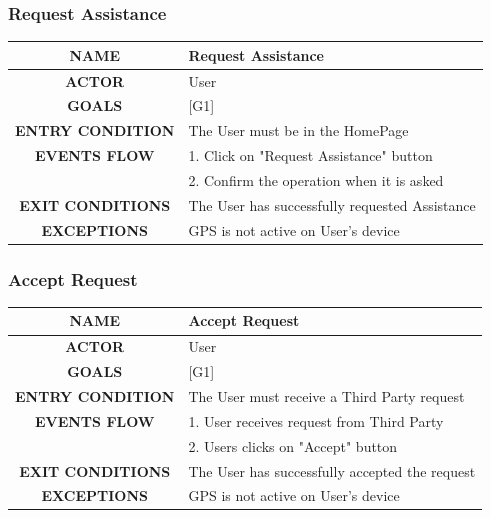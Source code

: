 \documentclass[12pt,a4paper]{article}
\begin{document}
	\subsubsection{Request Assistance}
	\begin{center}
		\begin{tabular}{| c | l |}
			\hline
			\textbf{NAME} & Request Assistance \\
			\hline
			\textbf{ACTOR} & User \\
			\hline
			\textbf{GOALS} & [G1] \\
			\hline
			\textbf{ENTRY CONDITION} & The User must be in the HomePage \\ \hline
			\textbf{EVENTS FLOW}  &
			1. Click on "Request Assistance" button\\
			&2. Confirm the operation when it is asked\\
			\hline
			\textbf{EXIT CONDITIONS}  & The User has successfully requested Assistance \\ \hline
			\textbf{EXCEPTIONS} & 
			GPS is not active on User's device\\
			\hline
		\end{tabular}
	\end{center}

	\subsubsection{Accept Request}
	\begin{center}
		\begin{tabular}{| c | l |}
			\hline
			\textbf{NAME} & Accept Request \\
			\hline
			\textbf{ACTOR} & User \\
			\hline
			\textbf{GOALS} & [G1] \\
			\hline
			\textbf{ENTRY CONDITION} & The User must receive a Third Party request \\ \hline
			\textbf{EVENTS FLOW}  &
			1. User receives request from Third Party\\
			&2. Users clicks on "Accept" button\\
			\hline
			\textbf{EXIT CONDITIONS}  & The User has successfully accepted the request \\ \hline
			\textbf{EXCEPTIONS} & 
			GPS is not active on User's device\\
			\hline
		\end{tabular}
	\end{center}
\end{document}
